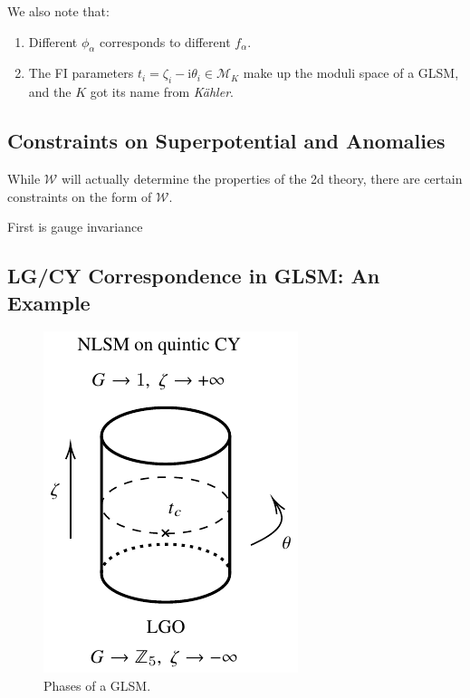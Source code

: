 \documentclass{article}
\newcommand{\ii}{\mathrm{i}}
\begin{document}
We also note that:
\begin{enumerate}
    \item Different $\phi_\alpha$ corresponds to different $f_\alpha$.
    \item The FI parameters $t_i=\zeta_i-\ii\theta_i\in \mathscr{M}_K$ make up the moduli space of a GLSM, and the $K$ got its name from \textit{K\"{a}hler}.
\end{enumerate}

\subsection{Constraints on Superpotential and Anomalies}
While $\mathcal{W}$ will actually determine the properties of the 2d theory, there are certain constraints on the form of $\mathcal{W}$.

First is gauge invariance


\subsection{LG/CY Correspondence in GLSM: An Example}
\begin{figure}[htbp]
	\centering
	\includegraphics{LG-CY.pdf}
	\caption{Phases of a GLSM.}
	\label{fig:ospquiver}
\end{figure}



\nocite{Hori:2000ck,Hori:2003ic,Hori:2000kt,Hori:2006dk,Hori:2002,Hori:2016}


\end{document}
